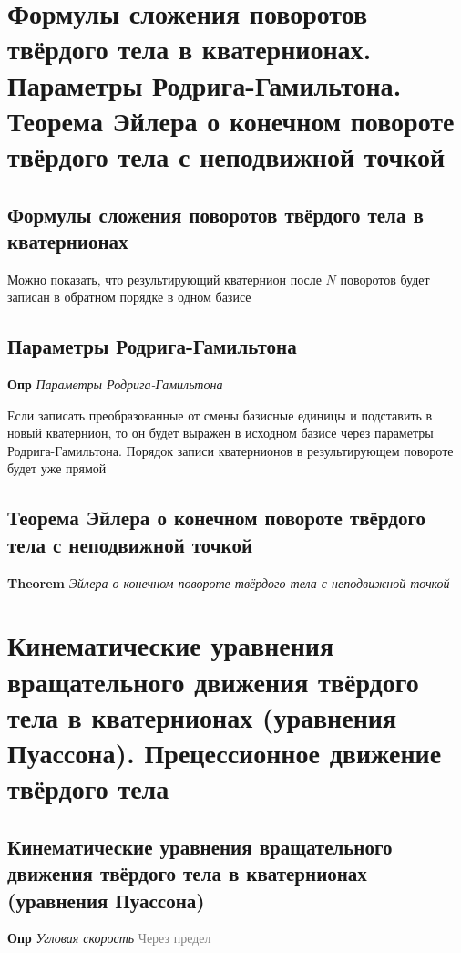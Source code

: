 \documentclass[a4paper, 14pt]{article}
\begin{document}
    \section{Формулы сложения поворотов твёрдого тела в кватернионах.
    Параметры Родрига-Гамильтона.
    Теорема Эйлера о конечном повороте твёрдого тела с неподвижной точкой}
    
    \subsection{Формулы сложения поворотов твёрдого тела в кватернионах}
    
    Можно показать, что результирующий кватернион после $N$ поворотов будет записан в обратном порядке в одном базисе
    
    \subsection{Параметры Родрига-Гамильтона}
    
    \textbf{Опр} \textit{Параметры Родрига-Гамильтона}
    
    Если записать преобразованные от смены базисные единицы и подставить в новый кватернион, то он будет выражен в
    исходном базисе через параметры Родрига-Гамильтона.
    Порядок записи кватернионов в результирующем повороте будет уже прямой
    
    \subsection{Теорема Эйлера о конечном повороте твёрдого тела с неподвижной точкой}
    
    \textbf{Theorem} \textit{Эйлера о конечном повороте твёрдого тела с неподвижной точкой}
    
    \section{Кинематические уравнения вращательного движения твёрдого тела в кватернионах (уравнения Пуассона).
    Прецессионное движение твёрдого тела}
    
    \subsection{Кинематические уравнения вращательного движения твёрдого тела в кватернионах (уравнения Пуассона)}
    
    \textbf{Опр} \textit{Угловая скорость} \textcolor{gray}{Через предел}
    
\end{document}
